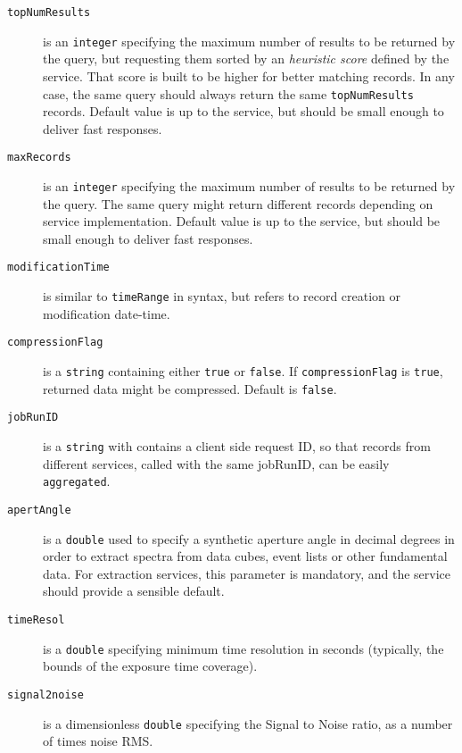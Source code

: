 \begin{description}
		\item[\texttt{topNumResults}] is an \texttt{integer}
        specifying the maximum number of results to be returned by
        the query, but requesting them sorted by an \emph{heuristic
        score} defined by the service. That score is built to be
        higher for better matching records. In any case, the same
        query should always return the same \texttt{topNumResults}
        records. Default value is up to the service, but should be
        small enough to deliver fast responses.
		
		\item[\texttt{maxRecords}] is an \texttt{integer} 
		specifying the maximum number of results to be returned by 
		the query. The same query might return different records 
		depending on service implementation. Default value is up 
		to the service, but should be small enough to deliver fast 
		responses.
		
		\item[\texttt{modificationTime}] is similar to 
		\texttt{timeRange} in syntax, but refers to record 
		creation or modification date-time.
		
		\item[\texttt{compressionFlag}] is a \texttt{string} 
		containing either \texttt{true} or \texttt{false}. If 
		\texttt{compression\-Flag} is \texttt{true}, returned 
		data might be compressed. Default is \texttt{false}.
		
		\item[\texttt{jobRunID}] is a \texttt{string} with 
		contains a client side request ID, so that records from 
		different services, called with the same jobRunID, can 
		be easily \texttt{aggregated}.
		
		\item[\texttt{apertAngle}] is a \texttt{double} used to
		specify a synthetic aperture angle in decimal degrees in
		order to extract spectra from data cubes, event lists or 
		other fundamental data. For extraction services, this 
		parameter is mandatory, and the service should provide a
		sensible default.
		
		\item[\texttt{timeResol}] is a \texttt{double} specifying
        minimum time resolution in seconds (typically, the bounds of
        the exposure time coverage).
		
		\item[\texttt{signal2noise}] is a dimensionless
        \texttt{double} specifying the Signal to Noise ratio, as a
        number of times noise RMS.
					

\end{description}
